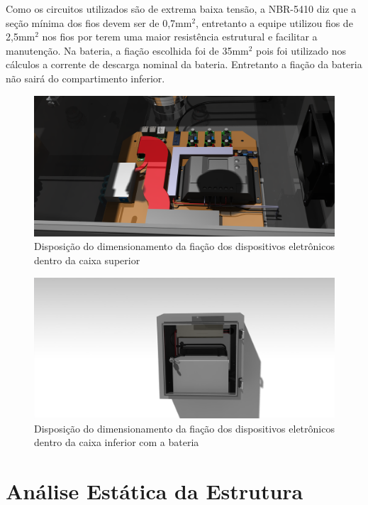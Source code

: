 Como os circuitos utilizados são de extrema baixa tensão, a NBR-5410 diz que a seção mínima dos fios devem ser de 0,7mm$^2$, entretanto a equipe utilizou fios de 2,5mm$^2$ nos fios por terem uma maior resistência estrutural e facilitar a manutenção. Na bateria, a fiação escolhida foi de 35mm$^2$ pois foi utilizado nos cálculos a corrente de descarga nominal da bateria. Entretanto a fiação da bateria não sairá do compartimento inferior.

\begin{figure}[H]
	\centering
    \includegraphics[keepaspectratio=true,scale=0.5]{figuras/caixa1elet.png}
    \caption{Disposição do dimensionamento da fiação dos dispositivos eletrônicos dentro da caixa superior}
    \label{caixa1elet}
\end{figure}

\begin{figure}[H]
	\centering
    \includegraphics[keepaspectratio=true,scale=0.5]{figuras/caixa2elet.png}
    \caption{Disposição do dimensionamento da fiação dos dispositivos eletrônicos dentro da caixa inferior com a bateria}
    \label{caixa2elet}
\end{figure}



\section{Análise Estática da Estrutura}

